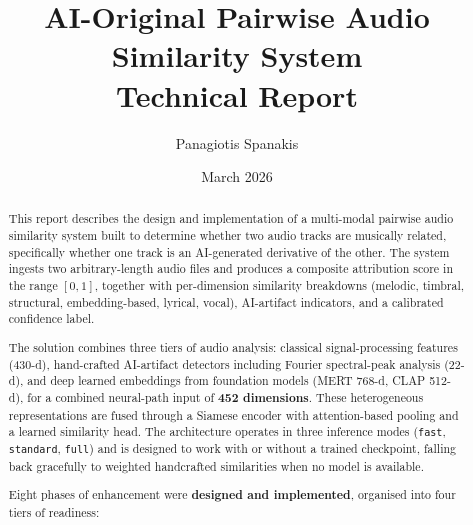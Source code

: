 \documentclass[11pt,a4paper]{article}
\title{\textbf{AI-Original Pairwise Audio Similarity System}\\[0.3em]
       \large Technical Report}
\author{Panagiotis Spanakis}
\date{March 2026}
\begin{document}
\maketitle
\tableofcontents
\newpage

\begin{abstract}

This report describes the design and implementation of a multi-modal pairwise audio similarity system built to determine whether two audio tracks are musically related, specifically whether one track is an AI-generated derivative of the other. The system ingests two arbitrary-length audio files and produces a composite attribution score in the range $[0, 1]$, together with per-dimension similarity breakdowns (melodic, timbral, structural, embedding-based, lyrical, vocal), AI-artifact indicators, and a calibrated confidence label.

The solution combines three tiers of audio analysis: classical signal-processing features (430-d), hand-crafted AI-artifact detectors including Fourier spectral-peak analysis (22-d), and deep learned embeddings from foundation models (MERT 768-d, CLAP 512-d), for a combined neural-path input of \textbf{452 dimensions}. These heterogeneous representations are fused through a Siamese encoder with attention-based pooling and a learned similarity head. The architecture operates in three inference modes (\texttt{fast}, \texttt{standard}, \texttt{full}) and is designed to work with or without a trained checkpoint, falling back gracefully to weighted handcrafted similarities when no model is available.

Eight phases of enhancement were \textbf{designed and implemented}, organised into four tiers of readiness:


\end{abstract}
\end{document}
